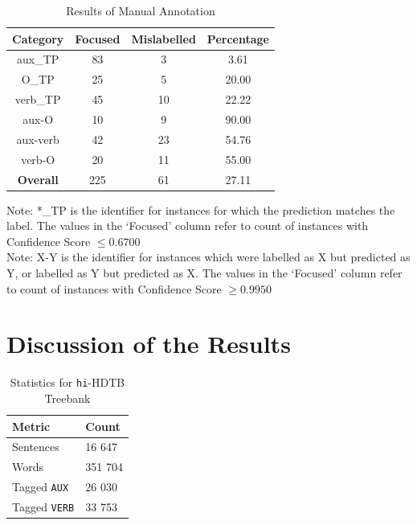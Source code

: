 \begin{table}[H]
    \centering
    \begin{tabular}{|c|c|c|c|}
    \hline 
    \textbf{Category} & \textbf{Focused} & \textbf{Mislabelled} & \textbf{Percentage}\\
    \hline 
    aux\_TP & 83 & 3 & 3.61 \\
    O\_TP & 25 & 5 & 20.00 \\
    verb\_TP & 45 & 10 & 22.22 \\
    \hline
    aux-O & 10 & 9 & 90.00 \\
    aux-verb & 42 & 23 & 54.76 \\
    verb-O & 20 & 11 & 55.00 \\
    \hline
    \hline
    \textbf{Overall} & 225 & 61 & 27.11 \\
    \hline
    \end{tabular}
    \caption[Results of Manual Annotation]{Results of Manual Annotation}
    Note: *\_TP is the identifier for instances for which the prediction matches the label. The values in the `Focused' column refer to count of instances with Confidence Score $\leq 0.6700$\\
    Note: X-Y is the identifier for instances which were labelled as X but predicted as Y, or labelled as Y but predicted as X. The values in the `Focused' column refer to count of instances with Confidence Score $\geq 0.9950$\\
\label{tab:auxverbResults}
\end{table}

\section{Discussion of the Results}
\label{ssec:auxverbDiscussion}

\begin{table}[h]
    \centering
    \begin{tabular}{|l|l|}
        \hline
        \textbf{Metric} & \textbf{Count} \\
        \hline
        Sentences & 16 647 \\
        Words & 351 704 \\
        Tagged \verb|AUX| & 26 030 \\
        Tagged \verb|VERB| & 33 753 \\
        \hline
    \end{tabular}
    \caption{Statistics for \texttt{hi}-HDTB Treebank}
    \label{tab:auxverbDetails}
\end{table}

